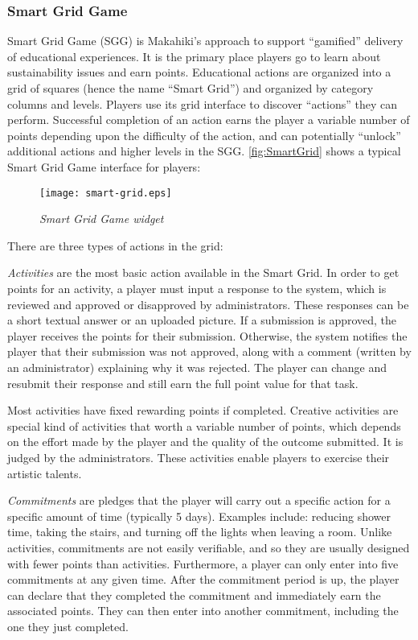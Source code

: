 \clearpage

\subsubsection{Smart Grid Game}

Smart Grid Game (SGG) is Makahiki's approach to support ``gamified'' delivery of educational experiences. It is the primary place players go to learn about sustainability issues and earn points. Educational actions are organized into a grid of squares (hence the name ``Smart Grid'') and organized by category columns and levels. Players use its grid interface to discover ``actions'' they can perform. Successful completion of an action earns the player a variable number of points depending upon the difficulty of the action, and can potentially ``unlock'' additional actions and higher levels in the SGG. \autoref{fig:SmartGrid} shows a typical Smart Grid Game interface for players:

\begin{figure}[!ht]
  \center
  \texttt{[image: smart-grid.eps]}
  \caption{\em Smart Grid Game widget}
  \label{fig:SmartGrid}
\end{figure}

There are three types of actions in the grid:

{\em Activities} are the most basic action available in the Smart Grid. In order to get points for an activity, a player must input a response to the system, which is reviewed and approved or disapproved by administrators. These responses can be a short textual answer or an uploaded picture. If a submission is approved, the player receives the points for their submission. Otherwise, the system notifies the player that their submission was not approved, along with a comment (written by an administrator) explaining why it was rejected. The player can change and resubmit their response and still earn the full point value for that task. 

Most activities have fixed rewarding points if completed. Creative activities are special kind of activities that worth a variable number of points, which depends on the effort made by the player and the quality of the outcome submitted. It is judged by the administrators. These activities enable players to exercise their artistic talents. 

{\em Commitments} are pledges that the player will carry out a specific action for a specific amount of time (typically 5 days). Examples include: reducing shower time, taking the stairs, and turning off the lights when leaving a room. Unlike activities, commitments are not easily verifiable, and so they are usually designed with fewer points than activities. Furthermore, a player can only enter into five commitments at any given time. After the commitment period is up, the player can declare that they completed the commitment and immediately earn the associated points. They can then enter into another commitment, including the one they just completed. 

